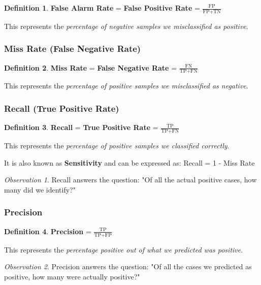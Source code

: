 \documentclass[11pt,a4paper]{article}
\theoremstyle{definition}
\newtheorem{definition}{Definition}[section]
\theoremstyle{plain}
\theoremstyle{remark}
\newtheorem*{observation}{Observation}
\begin{document}
\begin{definition}
\textbf{False Alarm Rate} = \textbf{False Positive Rate} = $\frac{\text{FP}}{\text{FP} + \text{TN}}$

This represents the \textit{percentage of negative samples we misclassified as positive}.
\end{definition}

\subsubsection{Miss Rate (False Negative Rate)}

\begin{definition}
\textbf{Miss Rate} = \textbf{False Negative Rate} = $\frac{\text{FN}}{\text{TP} + \text{FN}}$

This represents the \textit{percentage of positive samples we misclassified as negative}.
\end{definition}

\subsubsection{Recall (True Positive Rate)}

\begin{definition}
\textbf{Recall} = \textbf{True Positive Rate} = $\frac{\text{TP}}{\text{TP} + \text{FN}}$

This represents the \textit{percentage of positive samples we classified correctly}. 

It is also known as \textbf{Sensitivity} and can be expressed as: Recall = 1 - Miss Rate
\end{definition}

\begin{observation}
Recall answers the question: "Of all the actual positive cases, how many did we identify?"
\end{observation}

\subsubsection{Precision}

\begin{definition}
\textbf{Precision} = $\frac{\text{TP}}{\text{TP} + \text{FP}}$

This represents the \textit{percentage positive out of what we predicted was positive}.
\end{definition}

\begin{observation}
Precision answers the question: "Of all the cases we predicted as positive, how many were actually positive?"
\end{observation}
\end{document}
